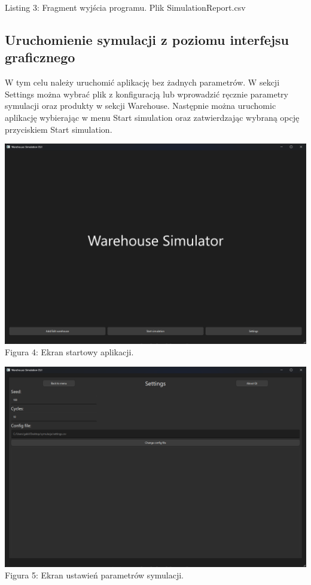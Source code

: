 \documentclass[11pt]{article}
\begin{document}
\begin{center}
    Listing 3: Fragment wyjścia programu. Plik SimulationReport.csv
\end{center}

\newpage

\subsection{Uruchomienie symulacji z poziomu interfejsu graficznego}
W tym celu należy uruchomić aplikację bez żadnych parametrów. W sekcji Settings można wybrać plik z konfiguracją lub wprowadzić ręcznie parametry symulacji oraz produkty w sekcji Warehouse. Następnie można uruchomic aplikację wybierając w menu Start simulation oraz zatwierdzając wybraną opcję przyciskiem Start simulation.

\begin{center}
    \includegraphics[scale=0.45]{menu.png}
    Figura 4: Ekran startowy aplikacji.
\end{center}
\begin{center}
    \includegraphics[scale=0.45]{ustawienia.png}
    Figura 5: Ekran ustawień parametrów symulacji.
\end{center}
\end{document}

